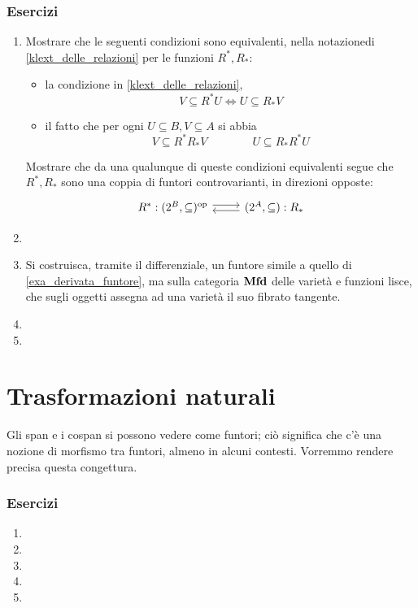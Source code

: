 \begin{definition}\label{def_cat_cocomma}
\end{definition}


\subsubsection*{Esercizi}
\begin{enumerate}
	\item Mostrare che le seguenti condizioni sono equivalenti, nella notazionedi \ref{klext_delle_relazioni} per le funzioni $R^*,R_*$:
	\begin{itemize}
		\item la condizione in \ref{klext_delle_relazioni}, 
		\[V\subseteq R^*U\iff U\subseteq R_*V\]
		\item il fatto che per ogni $U\subseteq B,V\subseteq A$ si abbia 
		\[V\subseteq R^*R_*V\qquad\qquad U\subseteq R_*R^*U\]
	\end{itemize}
	Mostrare che da una qualunque di queste condizioni equivalenti segue che $R^*,R_*$ sono una coppia di funtori controvarianti, in direzioni opposte:
	\[\begin{tikzcd}
		R^* : (2^B,\subseteq)^\op \ar[r, shift left] & (2^A,\subseteq) : R_* \ar[l, shift left]
	\end{tikzcd}\]
	\item
	\item Si costruisca, tramite il differenziale, un funtore simile a quello di \ref{exa_derivata_funtore}, ma sulla categoria \(\mathbf{Mfd}\) delle varietà e funzioni lisce, che sugli oggetti assegna ad una varietà il suo fibrato tangente.
	\item
	\item
\end{enumerate}

\section{Trasformazioni naturali}\label{sec_tnat}
Gli span e i cospan si possono vedere come funtori; ciò significa che c'è una nozione di morfismo tra funtori, almeno in alcuni contesti. Vorremmo rendere precisa questa congettura.
\subsubsection*{Esercizi}
\begin{enumerate}
	\item
	\item
	\item
	\item
	\item
\end{enumerate}
